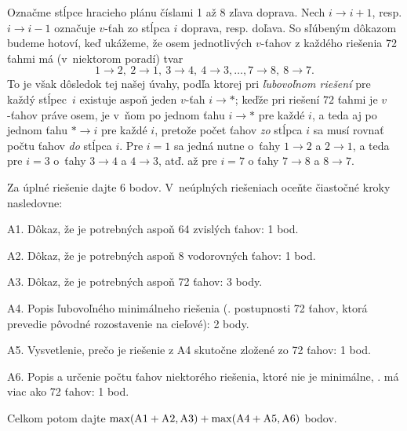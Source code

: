 {Označme stĺpce hracieho plánu číslami 1 až 8 zľava doprava.
Nech $i\to i+1$, resp. $i\to i-1$ označuje $v$-ťah zo stĺpca $i$
doprava, resp. doľava. So sľúbeným dôkazom budeme hotoví, keď
ukážeme, že osem jednotlivých $v$-ťahov z každého riešenia 72 ťahmi
má (v~niektorom poradí) tvar
$$
1\to2,\ 2\to1,\ 3\to4,\ 4\to 3,\dots,7\to8,\ 8\to7.
$$
To je však dôsledok tej našej úvahy, podľa ktorej pri
\emph{ľubovoľnom riešení} pre každý stĺpec~$i$ existuje
aspoň jeden $v$-ťah $i\to{\ast}$; keďže pri
riešení $72$ ťahmi je $v$-ťahov práve osem, je
v~ňom po jednom ťahu $i\to{\ast}$ pre každé $i$, a teda
aj po jednom ťahu ${\ast}\to i$ pre každé $i$, pretože
počet ťahov \emph{zo} stĺpca $i$ sa musí rovnať počtu ťahov
\emph{do} stĺpca $i$.
Pre $i=1$ sa jedná nutne o~ťahy $1\to2$ a $2\to1$, a teda pre
$i=3$ o~ťahy $3\to4$ a $4\to3$, atď. až pre $i=7$ o ťahy $7\to8$ a
$8\to7$.


\schemaABC
Za úplné riešenie dajte 6 bodov. V~neúplných riešeniach oceňte
čiastočné kroky nasledovne:
\item{A1.} Dôkaz, že je potrebných aspoň 64 zvislých ťahov: 1 bod.
\item{A2.} Dôkaz, že je potrebných aspoň 8 vodorovných ťahov: 1 bod.
\item{A3.} Dôkaz, že je potrebných aspoň 72 ťahov: 3 body.
\item{A4.} Popis ľubovoľného minimálneho riešenia (\tj. postupnosti 72 ťahov, ktorá prevedie pôvodné rozostavenie na cieľové): 2 body.
\item{A5.} Vysvetlenie, prečo je riešenie z A4 skutočne zložené zo 72 ťahov: 1 bod.
\item{A6.} Popis a určenie počtu ťahov niektorého riešenia, ktoré nie je minimálne, \tj. má viac ako 72 ťahov: 1 bod.

\noindent
Celkom potom dajte $\rm\max(A1+A2,A3)+\max(A4+A5,A6)$ bodov.
\endschema
}

